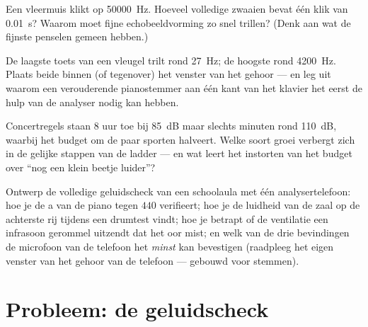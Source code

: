 \begin{exercise}[$\star\star$]\label{exo:g8:sound-pitch-loudness:9}
Een vleermuis klikt op \qty{50000}{Hz}. Hoeveel volledige zwaaien
bevat één klik van \qty{0.01}{s}? Waarom moet fijne
echobeeldvorming zo snel trillen? (Denk aan wat de fijnste
penselen gemeen hebben.)
\end{exercise}

\begin{exercise}[$\star\star$]\label{exo:g8:sound-pitch-loudness:10}
De laagste toets van een vleugel trilt rond \qty{27}{Hz}; de hoogste
rond \qty{4200}{Hz}. Plaats beide binnen (of tegenover) het venster van
het gehoor --- en leg uit waarom een verouderende pianostemmer aan
één kant van het klavier het eerst de hulp van de analyser nodig kan
hebben.
\end{exercise}

\begin{exercise}[$\star\star$]\label{exo:g8:sound-pitch-loudness:11}
Concertregels staan $8$ uur toe bij \qty{85}{dB} maar slechts
minuten rond \qty{110}{dB}, waarbij het budget om de paar sporten
halveert. Welke soort groei verbergt zich in de gelijke stappen van de
ladder --- en wat leert het instorten van het budget over ``nog een
klein beetje luider''?
\end{exercise}

\begin{exercise}[$\star\star\star$]\label{exo:g8:sound-pitch-loudness:12}
Ontwerp de volledige geluidscheck van een schoolaula met één
analysertelefoon: hoe je de a van de piano tegen $440$ verifieert; hoe
je de luidheid van de zaal op de achterste rij tijdens een drumtest
vindt; hoe je betrapt of de ventilatie een infrasoon gerommel uitzendt
dat het oor mist; en welk van de drie bevindingen de microfoon van de
telefoon het \emph{minst} kan bevestigen (raadpleeg het eigen venster
van het gehoor van de telefoon --- gebouwd voor stemmen).
\end{exercise}

\section{Probleem: de geluidscheck}

